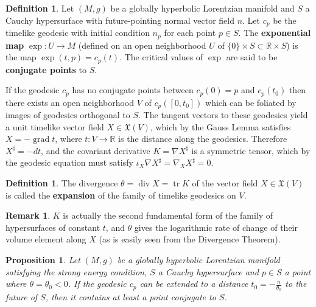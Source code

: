 \documentclass[12pt]{amsart}
\newcommand{\bbR}{\mathbb{R}}      %
\newcommand{\tr}{\operatorname{tr}}
\newcommand{\grad}{\operatorname{grad}}
\newcommand{\dive}{\operatorname{div}}
\newcommand{\cX}{\mathfrak{X}}
\newtheorem{Prop}[Thm]{Proposition}
\theoremstyle{definition}
\newtheorem{Def}[Thm]{Definition}
\newtheorem{Remark}[Thm]{Remark}
\theoremstyle{remark}
\begin{document}
\begin{Def}
Let $(M,g)$ be a globally hyperbolic Lorentzian manifold and $S$ a Cauchy hypersurface with future-pointing normal vector field $n$. Let $c_p$ be the timelike geodesic with initial condition $n_p$ for each point $p \in S$. The {\bf exponential map} $\exp:U \to M$ (defined on an open neighborhood $U$ of $\{0\} \times S \subset \bbR \times S$) is the map $\exp(t,p)=c_p(t)$. The critical values of $\exp$ are said to be {\bf conjugate points} to $S$.
\end{Def}

If the geodesic $c_p$ has no conjugate points between $c_p(0)=p$ and $c_p(t_0)$ then there exists an open neighborhood $V$ of $c_p([0,t_0])$ which can be foliated by images of geodesics orthogonal to $S$. The tangent vectors to these geodesics yield a unit timelike vector field $X \in \cX(V)$, which by the Gauss Lemma satisfies $X = - \grad t$, where $t:V \to \bbR$ is the distance along the geodesics. Therefore $X^\sharp = -dt$, and the covariant derivative $K=\nabla X^\sharp$ is a symmetric tensor, which by the geodesic equation must satisfy $\iota_X \nabla X^\sharp = \nabla_X X^\sharp = 0$.

\begin{Def}
The divergence $\theta = \dive X = \tr K$ of the vector field $X \in \cX(V)$ is called the {\bf expansion} of the family of timelike geodesics on $V$.
\end{Def}

\begin{Remark}
$K$ is actually the second fundamental form of the family of hypersurfaces of constant $t$, and $\theta$ gives the logarithmic rate of change of their volume element along $X$ (as is easily seen from the Divergence Theorem). 
\end{Remark}


\begin{Prop} \label{exist_conj_prop}
Let $(M,g)$ be a globally hyperbolic Lorentzian manifold satisfying the strong energy condition, $S$ a Cauchy hypersurface and $p \in S$ a point where $\theta=\theta_0 < 0$. If the geodesic $c_p$ can be extended to a distance $t_0= -\frac{n}{\theta_0}$ to the future of $S$, then it contains at least a point conjugate to $S$.
\end{Prop}
\end{document}
